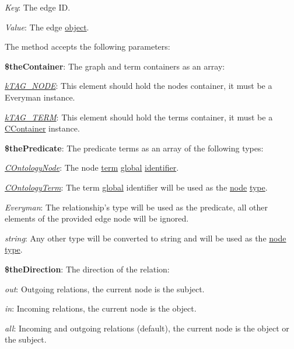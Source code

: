 \begin{DoxyItemize}
\item {\itshape Key}\-: The edge I\-D. 
\item {\itshape Value}\-: The edge \hyperlink{class_c_ontology_edge}{object}. 
\end{DoxyItemize}

The method accepts the following parameters\-:


\begin{DoxyItemize}
\item {\bfseries \$the\-Container}\-: The graph and term containers as an array\-: 
\begin{DoxyItemize}
\item {\itshape \hyperlink{}{k\-T\-A\-G\-\_\-\-N\-O\-D\-E}}\-: This element should hold the nodes container, it must be a Everyman instance. 
\item {\itshape \hyperlink{}{k\-T\-A\-G\-\_\-\-T\-E\-R\-M}}\-: This element should hold the terms container, it must be a \hyperlink{class_c_container}{C\-Container} instance. 
\end{DoxyItemize}
\item {\bfseries \$the\-Predicate}\-: The predicate terms as an array of the following types\-: 
\begin{DoxyItemize}
\item {\itshape \hyperlink{class_c_ontology_node}{C\-Ontology\-Node}}\-: The node \hyperlink{class_c_ontology_node_a2f294a9c93079f58190cedbdd0c09068}{term} \hyperlink{}{global} \hyperlink{class_c_ontology_term_object_ab1a4d21bb56a8a6cf3f77f595d776267}{identifier}. 
\item {\itshape \hyperlink{class_c_ontology_term}{C\-Ontology\-Term}}\-: The term \hyperlink{}{global} identifier will be used as the \hyperlink{class_c_ontology_edge}{node} \hyperlink{class_c_graph_edge_a584c0263fd773ffb764385a51d36caf2}{type}. 
\item {\itshape Everyman}\-: The relationship's type will be used as the predicate, all other elements of the provided edge node will be ignored. 
\item {\itshape string}\-: Any other type will be converted to string and will be used as the \hyperlink{class_c_ontology_edge}{node} \hyperlink{class_c_graph_edge_a584c0263fd773ffb764385a51d36caf2}{type}. 
\end{DoxyItemize}
\item {\bfseries \$the\-Direction}\-: The direction of the relation\-: 
\begin{DoxyItemize}
\item {\itshape out}\-: Outgoing relations, the current node is the subject. 
\item {\itshape in}\-: Incoming relations, the current node is the object. 
\item {\itshape all}\-: Incoming and outgoing relations (default), the current node is the object or the subject. 
\end{DoxyItemize}
\end{DoxyItemize}


